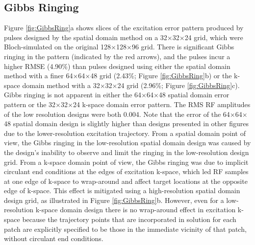 \subsection*{Gibbs Ringing}
Figure \ref{fig:GibbsRing}a shows slices of the excitation error pattern produced by pulses designed by the spatial domain method
on a 32$\times$32$\times$24 grid, which were Bloch-simulated on the original 128$\times$128$\times$96 grid. 
There is significant Gibbs ringing in the pattern (indicated by the red arrows),
and the pulses incur a higher RMSE (4.90\%) than pulses designed using either the spatial domain method with a finer 64$\times$64$\times$48 grid
(2.43\%; Figure \ref{fig:GibbsRing}b) or the k-space domain method with a 32$\times$32$\times$24 grid (2.96\%; Figure \ref{fig:GibbsRing}c). 
Gibbs ringing is not apparent in either the 64$\times$64$\times$48 spatial domain error pattern or the 32$\times$32$\times$24 k-space domain error pattern. 
The RMS RF amplitudes of the low resolution designs were both 0.004. 
Note that the error of the 64$\times$64$\times$48 spatial domain design is slightly higher than designs presented in other figures
due to the lower-resolution excitation trajectory. 
From a spatial domain point of view, 
the Gibbs ringing in the low-resolution spatial domain design was caused by the design's inability to observe and limit the ringing in the low-resolution design grid. 
From a k-space domain point of view, the Gibbs ringing was due to implicit circulant end conditions at the edges of excitation k-space,
which led RF samples at one edge of k-space to wrap-around and affect target locations at the opposite edge of k-space. 
This effect is mitigated using a high-resolution spatial domain design grid, as illustrated in Figure \ref{fig:GibbsRing}b. 
However, even for a low-resolution k-space domain design there is no wrap-around effect in excitation k-space 
because the trajectory points that are incorporated in solution for each patch are explicitly specified to be those in the immediate vicinity of 
that patch, without circulant end conditions. 




